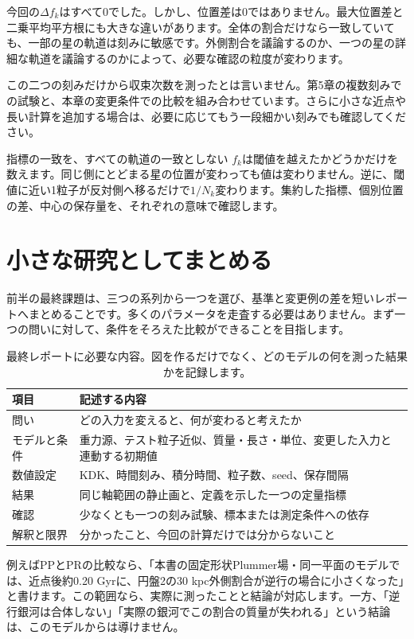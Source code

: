 今回の$\Delta f_k$はすべて0でした。しかし、位置差は0ではありません。最大位置差と二乗平均平方根にも大きな違いがあります。全体の割合だけなら一致していても、一部の星の軌道は刻みに敏感です。外側割合を議論するのか、一つの星の詳細な軌道を議論するのかによって、必要な確認の粒度が変わります。

この二つの刻みだけから収束次数を測ったとは言いません。第5章の複数刻みでの試験と、本章の変更条件での比較を組み合わせています。さらに小さな近点や長い計算を追加する場合は、必要に応じてもう一段細かい刻みでも確認してください。

\begin{failbox}{指標の一致を、すべての軌道の一致としない}
$f_k$は閾値を越えたかどうかだけを数えます。同じ側にとどまる星の位置が変わっても値は変わりません。逆に、閾値に近い1粒子が反対側へ移るだけで$1/N_k$変わります。集約した指標、個別位置の差、中心の保存量を、それぞれの意味で確認します。
\end{failbox}

\section{小さな研究としてまとめる}
\label{sec:ch6-report}
前半の最終課題は、三つの系列から一つを選び、基準と変更例の差を短いレポートへまとめることです。多くのパラメータを走査する必要はありません。まず一つの問いに対して、条件をそろえた比較ができることを目指します。
\begin{table}[htbp]\centering\small
\caption{最終レポートに必要な内容。図を作るだけでなく、どのモデルの何を測った結果かを記録します。}\label{tab:ch6-report}
\begin{tabularx}{\linewidth}{lX}\toprule
項目 & 記述する内容 \\\midrule
問い & どの入力を変えると、何が変わると考えたか \\
モデルと条件 & 重力源、テスト粒子近似、質量・長さ・単位、変更した入力と連動する初期値 \\
数値設定 & KDK、時間刻み、積分時間、粒子数、seed、保存間隔 \\
結果 & 同じ軸範囲の静止画と、定義を示した一つの定量指標 \\
確認 & 少なくとも一つの刻み試験、標本または測定条件への依存 \\
解釈と限界 & 分かったこと、今回の計算だけでは分からないこと \\\bottomrule
\end{tabularx}
\end{table}

例えばPPとPRの比較なら、「本書の固定形状Plummer場・同一平面のモデルでは、近点後約0.20 Gyrに、円盤2の30 kpc外側割合が逆行の場合に小さくなった」と書けます。この範囲なら、実際に測ったことと結論が対応します。一方、「逆行銀河は合体しない」「実際の銀河でこの割合の質量が失われる」という結論は、このモデルからは導けません。

